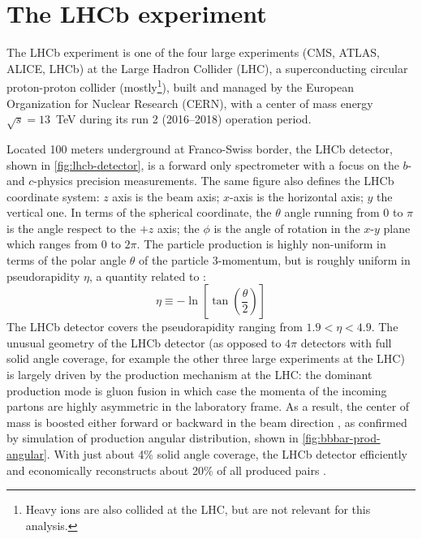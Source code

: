 \chapter{The LHCb experiment}
\label{ref:detector}

The LHCb experiment is one of the four large experiments (CMS, ATLAS, ALICE,
LHCb) at the Large Hadron Collider (LHC),
a superconducting circular proton-proton collider (mostly\footnote{
    Heavy ions are also collided at the LHC,
    but are not relevant for this analysis.
}), built and managed by
the European Organization for Nuclear Research (CERN),
with a center of mass energy
$\sqrt{s} = 13$~TeV during its run 2 (2016--2018) operation period.

Located 100 meters underground at Franco-Swiss border,
the LHCb detector,
shown in \cref{fig:lhcb-detector},
is a forward only spectrometer
with a focus on the $b$- and $c$-physics precision measurements.
The same figure also defines the LHCb coordinate system:
$z$ axis is the beam axis; $x$-axis is the horizontal axis; $y$ the vertical
one.
In terms of the spherical coordinate,
the $\theta$ angle running from 0 to $\pi$ is the angle respect to the
$+z$ axis;
the $\phi$ is the angle of rotation in the $x$-$y$ plane
which ranges from 0 to $2\pi$.
The particle production is highly non-uniform in terms of the polar angle
$\theta$ of the particle 3-momentum,
but is roughly uniform in pseudorapidity $\eta$, a quantity related to \theta:
\begin{equation}
    \eta \equiv -\ln\left[\tan\left(\frac{\theta}{2}\right)\right]
\end{equation}
The LHCb detector covers the pseudorapidity
ranging from $1.9 < \eta < 4.9$.
The unusual geometry of the LHCb detector
(as opposed to $4\pi$ detectors with full solid angle coverage,
for example the other three large experiments at the LHC)
is largely driven by the \bbbar production mechanism at the LHC:
the dominant production mode is gluon fusion in which case the momenta of the
incoming partons are highly asymmetric in the laboratory frame.
As a result, the \bbbar center of mass is boosted either forward or backward
in the beam direction \cite{Altarelli_2008},
as confirmed by simulation of \bbbar production angular distribution,
shown in \cref{fig:bbbar-prod-angular}.
With just about 4\% solid angle coverage,
the LHCb detector efficiently and economically reconstructs about 20\%
of all produced \bbbar pairs \cite{Belyaev_2021}.

